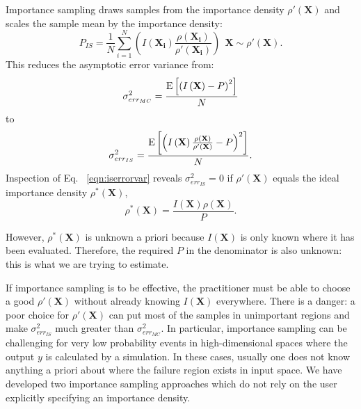 Importance sampling draws samples from the importance density 
$\rho'\left(\textbf{X}\right)$ and scales the sample mean by the importance density:
\begin{equation}
P_{IS}=\frac{1}{N}\sum_{i=1}^N \left(I\left(\mathbf{X_i}\right)\frac{\rho\left(\mathbf{X_i}\right)}{\rho'\left(\mathbf{X_i}\right)}\right)\ \ \textbf{X}\sim\rho'\left(\textbf{X}\right).\label{eqn:ispfail}
\end{equation}
This reduces the asymptotic error variance from:
\begin{equation}
\sigma_{err_{MC}}^2=\frac{{\rm E}\left[\left(I\left(\textbf{X}\right)-P\right)^2\right]}{N}
\end{equation}
to
\begin{equation}
\sigma_{err_{IS}}^2=\frac{{\rm E}\left[\left(I\left(\textbf{X}\right)\frac{\rho\left(\textbf{X}\right)}{\rho'\left(\textbf{X}\right)}
-P\right)^2\right]}{N}.
\label{eqn:iserrorvar}
\end{equation}
Inspection of Eq. ~\ref{eqn:iserrorvar} reveals $\sigma_{err_{IS}}^2=0$ if
$\rho'\left(\textbf{X}\right)$ equals the ideal importance density
$\rho^*\left(\textbf{X}\right)$,
\begin{equation}
\rho^*\left(\textbf{X}\right)=\frac{I\left(\textbf{X}\right)\rho\left(\textbf{X}\right)}{P}.\end{equation}
 
However, $\rho^*\left(\textbf{X}\right)$ is unknown a priori because
$I\left(\textbf{X}\right)$ is only known where it has been evaluated. 
Therefore, the required $P$ in the denominator is also unknown:  this is what we are trying to estimate.
 
If importance sampling is to be effective, the practitioner must be able to
choose a good $\rho'\left(\textbf{X}\right)$ without already knowing
$I\left(\textbf{X}\right)$ everywhere. 
There is a danger: a poor choice for $\rho'\left(\textbf{X}\right)$ can put most of the samples in
unimportant regions and make $\sigma_{err_{IS}}^2$ much greater than
$\sigma_{err_{MC}}^2$.
In particular, importance sampling can be challenging for very low probability events in high-dimensional spaces where
the output $y$ is calculated by a simulation. In these cases, usually one
does not know anything a priori about where the failure region exists
in input space. 
We have developed two importance sampling approaches which do not
rely on the user explicitly specifying an importance density.

